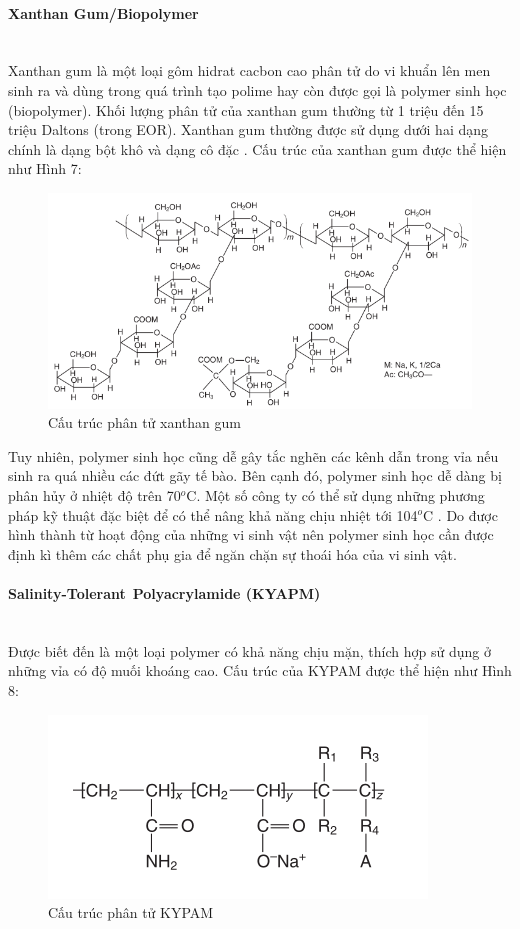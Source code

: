 \documentclass[12pt,a4paper]{article}
\newcommand{\subsubsubsection}[1]{\paragraph{#1}\mbox{}\\}
\begin{document}
	\subsubsubsection{Xanthan Gum/Biopolymer}
	Xanthan gum là một loại gôm hidrat cacbon cao phân tử do vi khuẩn lên men sinh ra và dùng trong quá trình tạo polime hay còn được gọi là polymer sinh học (biopolymer). Khối lượng phân tử của xanthan gum thường từ 1 triệu đến 15 triệu Daltons (trong EOR). Xanthan gum thường được sử dụng dưới hai dạng chính là dạng bột khô và dạng cô đặc \cite{sheng2010modern}. Cấu trúc của xanthan gum được thể hiện như Hình 7:
	\begin{figure}[h]
		\centering
		\includegraphics[scale=0.7]{Fig/xanthangum.PNG}
		\caption{Cấu trúc phân tử xanthan gum \cite{sheng2010modern}}
	\end{figure}
	\newline
	Tuy nhiên, polymer sinh học cũng dễ gây tắc nghẽn các kênh dẫn trong vỉa nếu sinh ra quá nhiều các đứt gãy tế bào. Bên cạnh đó, polymer sinh học dễ dàng bị phân hủy ở nhiệt độ trên 70$^o$C. Một số công ty có thể sử dụng những phương pháp kỹ thuật đặc biệt để có thể nâng khả năng chịu nhiệt tới 104$^o$C \cite{sheng2010modern}. Do được hình thành từ hoạt động của những vi sinh vật nên polymer sinh học cần được định kì thêm các chất phụ gia để ngăn chặn sự thoái hóa của vi sinh vật.
	\newpage
	\subsubsubsection{Salinity-Tolerant Polyacrylamide (KYAPM)}
	Được biết đến là một loại polymer có khả năng chịu mặn, thích hợp sử dụng ở những vỉa có độ muối khoáng cao. Cấu trúc của KYPAM được thể hiện như Hình 8:
	\begin{figure}[h]
		\centering
		\includegraphics[scale=1]{Fig/KYPAM.PNG}
		\caption{Cấu trúc phân tử KYPAM \cite{sheng2010modern}}
	\end{figure}
\end{document}
